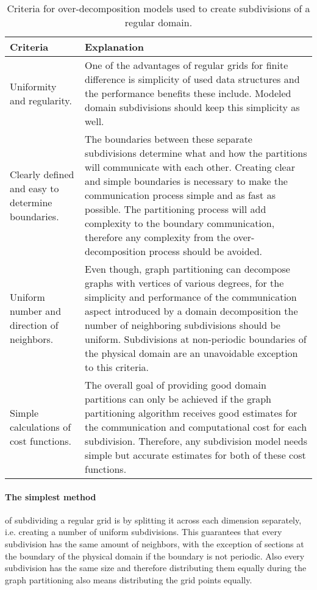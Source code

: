 \begin{table}[!htbp]
\centering
{}
\begin{tabular}{p{4.5cm} p{9.5cm}}
\toprule
Criteria & Explanation \\
\midrule
Uniformity and regularity.
&
One of the advantages of regular grids for finite difference is simplicity of used data structures and the performance benefits these include.
Modeled domain subdivisions should keep this simplicity as well.
\\
Clearly defined and easy to determine boundaries. 
&
The boundaries between these separate subdivisions determine what and how the partitions will communicate with each other.
Creating clear and simple boundaries is necessary to make the communication process simple and as fast as possible.
The partitioning process will add complexity to the boundary communication, therefore any complexity from the over-decomposition process should be avoided.
\\
Uniform number and direction of neighbors.
&
Even though, graph partitioning can decompose graphs with vertices of various degrees, for the simplicity and performance of the communication aspect introduced by a domain decomposition the number of neighboring subdivisions should be uniform. Subdivisions at non-periodic boundaries of the physical domain are an unavoidable exception to this criteria.
\\
Simple calculations of cost functions.
&
The overall goal of providing good domain partitions can only be achieved if the graph partitioning algorithm receives good estimates for the communication and computational cost for each subdivision.
Therefore, any subdivision model needs simple but accurate estimates for both of these cost functions.
\\
\bottomrule
\end{tabular}
\caption{Criteria for over-decomposition models used to create subdivisions of a regular domain.}
\label{tab:criteria}
\end{table}

\paragraph{The simplest method}of subdividing a regular grid is by splitting it across each dimension separately, i.e. creating a number of uniform subdivisions.
This guarantees that every subdivision has the same amount of neighbors, with the exception of sections at the boundary of the physical domain if the boundary is not periodic.
Also every subdivision has the same size and therefore distributing them equally during the graph partitioning also means distributing the grid points equally.

